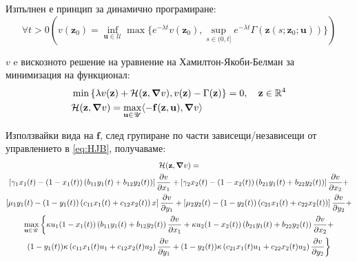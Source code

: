 Изпълнен е принцип за динамично програмиране:
\begin{equation}
  \forall{t>0} \left(v(\mathbf{z}_0) = \inf_{\mathbf{u} \in \mathscr{U}} \max\{e^{-\lambda t} v(\mathbf{z}_0), \sup_{s \in (0, t]} e^{-\lambda t} \Gamma(\mathbf{z}(s; \mathbf{z}_0; \mathbf{u}))\}\right)
\end{equation}

$v$ e вискозното решение на уравнение на Хамилтон-Якоби-Белман за минимизация на функционал:
\begin{equation}
  \label{eq:HJB}
  \begin{split}
    &\min\left\{\lambda v(\mathbf{z}) + \mathcal{H}(\mathbf{z}, \grad{v}), v(\mathbf{z}) - \Gamma(\mathbf{z})\right\} = 0, \quad \mathbf{z} \in \mathbb{R}^4 \\
    &\mathcal{H}(\mathbf{z}, \grad{v}) = \max_{\mathbf{u} \in \mathscr{U}} \langle -\mathbf{f}(\mathbf{z}, \mathbf{u}), \grad{v} \rangle
  \end{split}
\end{equation}

Използвайки вида на $\mathbf{f}$, след групиране по части зависещи/независещи от управлението в \eqref{eq:HJB}, получаваме:
\begin{multline}
  \label{eq:HamiltonianFull}
  \mathcal{H}(\mathbf{z}, \grad{v}) = \\
  \left[\gamma_1 x_1(t) - (1-x_1(t)) \left(b_{11} y_1(t) + b_{12} y_2(t)\right) \right] \pdv{v}{x_1} +
  \left[\gamma_2 x_2(t) - (1-x_2(t)) \left(b_{21} y_1(t) + b_{22} y_2(t)\right) \right] \pdv{v}{x_2} + \\
  \left[\mu_1 y_1(t) - (1-y_1(t)) \left(c_{11} x_1(t) + c_{12} x_2(t)\right) x\right] \pdv{v}{y_1} +
  \left[\mu_2 y_2(t) - (1-y_2(t)) \left(c_{21} x_1(t) + c_{22} x_2(t)\right)\right] \pdv{v}{y_2} + \\
  \max_{\mathbf{u} \in \mathscr{U}} \bigg\{\kappa u_1(1-x_1(t)) \left(b_{11} y_1(t) + b_{12} y_2(t)\right) \pdv{v}{x_1} +
    \kappa u_2 (1-x_2(t)) \left(b_{21} y_1(t) + b_{22} y_2(t)\right) \pdv{v}{x_2} + \\
    (1-y_1(t)) \kappa \left(c_{11} x_1(t) u_1 + c_{12} x_2(t) u_2 \right) \pdv{v}{y_1}+
  (1-y_2(t)) \kappa \left(c_{21} x_1(t) u_1 + c_{22} x_2(t) u_2 \right) \pdv{v}{y_2}\bigg\}
\end{multline}

